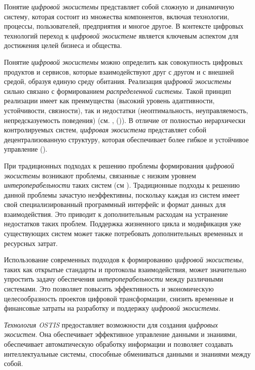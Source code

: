 Понятие \textit{цифровой экосистемы} представляет собой сложную и динамичную систему, которая состоит из множества компонентов, включая технологии, процессы, пользователей, предприятия и многое другое. В контексте цифровых технологий переход к \textit{цифровой экосистеме} является ключевым аспектом для достижения целей бизнеса и общества.

Понятие \textit{цифровой экосистемы} можно определить как совокупность цифровых продуктов и сервисов, которые взаимодействуют друг с другом и с внешней средой, образуя единую среду обитания. Реализация \textit{цифровой экосистемы} сильно связано с формированием \textit{распределенной системы}. Такой принцип реализации имеет как преимущества (высокий уровень адаптивности, устойчивости, связности), так и недостатки (неоптимальность, неуправляемость, непредсказуемость поведения) (см. , ()). В отличие от полностью иерархически контролируемых систем, \textit{цифровая экосистема} представляет собой децентрализованную структуру, которая обеспечивает более гибкое и устойчивое управление ().

При традиционных подходах к решению проблемы формирования \textit{цифровой экосистемы} возникают проблемы, связанные с низким уровнем \textit{интероперабельности} таких систем (см ). Традиционные подходы к решению данной проблемы зачастую неэффективны, поскольку каждая из систем имеет свой специализированный программный интерфейс и формат данных для взаимодействия. Это приводит к дополнительным расходам на устранение недостатков таких проблем. Поддержка жизненного цикла и модификация уже существующих систем может также потребовать дополнительных временных и ресурсных затрат.

Использование современных подходов к формированию \textit{цифровой экосистемы}, таких как открытые стандарты и протоколы взаимодействия, может значительно упростить задачу обеспечения \textit{интероперабельности} между различными системами. Это позволяет повысить эффективность и экономическую целесообразность проектов цифровой трансформации, снизить временные и финансовые затраты на разработку и поддержку \textit{цифровой экосистемы}.

\textit{Технология OSTIS} предоставляет возможности для создания \textit{цифровых экосистем}. Она обеспечивает эффективное управление данными и знаниями, обеспечивает автоматическую обработку информации и позволяет создавать интеллектуальные системы, способные обмениваться данными и знаниями между собой.

